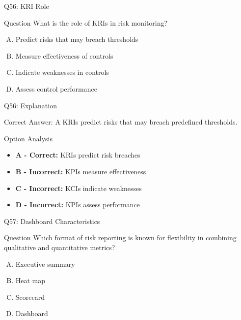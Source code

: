 \documentclass{beamer}
\begin{document}
	\begin{frame}{Q56: KRI Role}
		\begin{block}{Question}
			What is the role of KRIs in risk monitoring?
		\end{block}
		\begin{enumerate}[(A)]
			\item Predict risks that may breach thresholds
			\item Measure effectiveness of controls
			\item Indicate weaknesses in controls
			\item Assess control performance
		\end{enumerate}
	\end{frame}
	
	\begin{frame}{Q56: Explanation}
		\begin{block}{Correct Answer: A}
			KRIs predict risks that may breach predefined thresholds.
		\end{block}
		\begin{block}{Option Analysis}
			\begin{itemize}
				\item \textbf{A - Correct:} KRIs predict risk breaches
				\item \textbf{B - Incorrect:} KPIs measure effectiveness
				\item \textbf{C - Incorrect:} KCIs indicate weaknesses
				\item \textbf{D - Incorrect:} KPIs assess performance
			\end{itemize}
		\end{block}
	\end{frame}
	
	\begin{frame}{Q57: Dashboard Characteristics}
		\begin{block}{Question}
			Which format of risk reporting is known for flexibility in combining qualitative and quantitative metrics?
		\end{block}
		\begin{enumerate}[(A)]
			\item Executive summary
			\item Heat map
			\item Scorecard
			\item Dashboard
		\end{enumerate}
	\end{frame}
	
\end{document}
